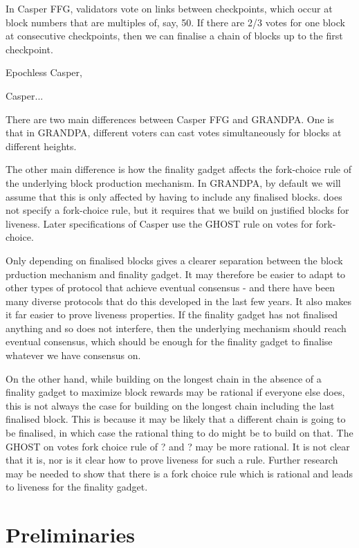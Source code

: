 \documentclass{article}
\begin{document}
In Casper FFG\cite{CasperFFG}, validators vote on links between checkpoints, which occur at block numbers that are multiples of, say, 50. If there are 2/3 votes for one block at consecutive checkpoints, then we can finalise a chain of blocks up to the first checkpoint.

Epochless Casper, 

Casper...

There are two main differences between Casper FFG and GRANDPA. One is that in GRANDPA, different voters can cast votes simultaneously for blocks at different heights.

The other main difference is how the finality gadget affects the fork-choice rule of the underlying block production mechanism. In GRANDPA, by default we will assume that this is only affected by having to include any finalised blocks. 
\cite{CasperFFG} does not specify a fork-choice rule, but it requires that we build on justified blocks for liveness. Later specifications of Casper use the GHOST rule on votes for fork-choice.

Only depending on finalised blocks gives a clearer separation between the block prduction mechanism and finality gadget. It may therefore be easier to adapt to other types of protocol that achieve eventual consensus - and there have been many diverse protocols that do this developed in the last few years. It also makes it far easier to prove liveness properties. If the finality gadget has not finalised anything and so does not interfere, then the underlying mechanism should reach eventual consensus, which should be enough for the finality gadget to finalise whatever we have consensus on.

On the other hand, while building on the longest chain in the absence of a finality gadget to maximize block rewards may be rational if everyone else does, this is not always the case for building on the longest chain including the last finalised block. This is because it may be likely that a different chain is going to be finalised, in which case the rational thing to do might be to build on that. The GHOST on votes fork choice rule of ? and ? may be more rational. It is not clear that it is, nor is it clear how to prove liveness for such a rule. Further research may be needed to show that there is a fork choice rule which is rational and leads to liveness for the finality gadget. 




\section{Preliminaries} \label{sec:prelims}
\end{document}

